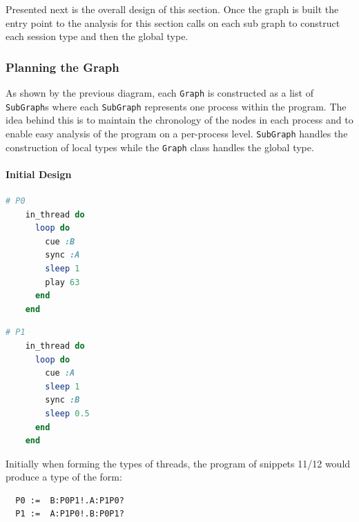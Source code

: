\documentclass[11pt]{scrartcl}
\begin{document}
Presented next is the overall design of this section. Once the graph is
built the entry point to the analysis for this section calls on each sub 
graph to construct each session type and then the global type.


\subsubsection{Planning the Graph}
As shown by the previous diagram, each \texttt{Graph} is constructed as
a list of \texttt{SubGraph}s where each \texttt{SubGraph} represents
one process within the program. The idea behind this is to maintain
the chronology of the nodes in each process and to enable easy analysis
of the program on a per-process level. \texttt{SubGraph} handles the construction
of local types while the \texttt{Graph} class handles the global type.

\paragraph{Initial Design}

\begin{multicols}{2}

	\begin{minipage}{0.45\textwidth}
		\begin{lstlisting}[language = ruby]
    # P0
    in_thread do
      loop do
        cue :B 
        sync :A
        sleep 1
        play 63
      end
    end
		\end{lstlisting}
	\end{minipage}
  
	\begin{minipage}{0.45\textwidth}
		\begin{lstlisting}[language = ruby]
    # P1
    in_thread do 
      loop do
        cue :A 
        sleep 1
        sync :B
        sleep 0.5
      end
    end
		\end{lstlisting}
	\end{minipage}

\end{multicols}

Initially when forming the types of threads, the program of snippets 11/12
would produce a type of the form:
\\
\begin{lstlisting}
  P0 :=  B:P0P1!.A:P1P0?
  P1 :=  A:P1P0!.B:P0P1?
\end{lstlisting}
\end{document}
